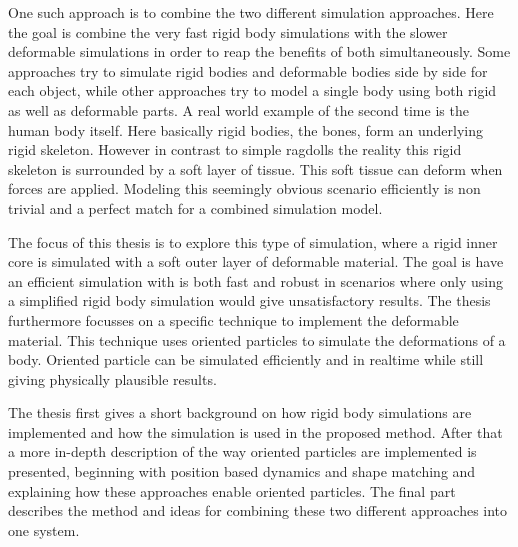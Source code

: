 One such approach is to combine the two different simulation approaches. Here the goal is combine the very fast rigid body simulations with the slower deformable simulations in order to reap the benefits of both simultaneously. Some approaches try to simulate rigid bodies and deformable bodies side by side for each object, while other approaches try to model a single body using both rigid as well as deformable parts. A real world example of the second time is the human body itself. Here basically rigid bodies, the bones, form an underlying rigid skeleton. However in contrast to simple ragdolls the reality this rigid skeleton is surrounded by a soft layer of tissue. This soft tissue can deform when forces are applied. Modeling this seemingly obvious scenario efficiently is non trivial and a perfect match for a combined simulation model.

The focus of this thesis is to explore this type of simulation, where a rigid inner core is simulated with a soft outer layer of deformable material. The goal is have an efficient simulation with is both fast and robust in scenarios where only using a simplified rigid body simulation would give unsatisfactory results. The thesis furthermore focusses on a specific technique to implement the deformable material. This technique uses oriented particles to simulate the deformations of a body. Oriented particle can be simulated efficiently and in realtime while still giving physically plausible results.

The thesis first gives a short background on how rigid body simulations are implemented and how the simulation is used in the proposed method. After that a more in-depth description of the way oriented particles are implemented is presented, beginning with position based dynamics and shape matching and explaining how these approaches enable oriented particles. The final part describes the method and ideas for combining these two different approaches into one system.